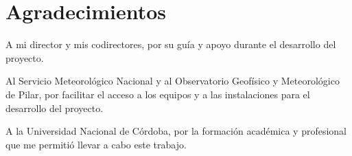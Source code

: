 \chapter*{Agradecimientos}
{}
A mi director y mis codirectores, por su guía y apoyo durante el desarrollo del proyecto.

Al Servicio Meteorológico Nacional y al Observatorio Geofísico y Meteorológico de Pilar, por facilitar el acceso a los equipos y a las instalaciones para el desarrollo del proyecto.

A la Universidad Nacional de Córdoba, por la formación académica y profesional que me permitió llevar a cabo este trabajo.

\cleardoublepage
